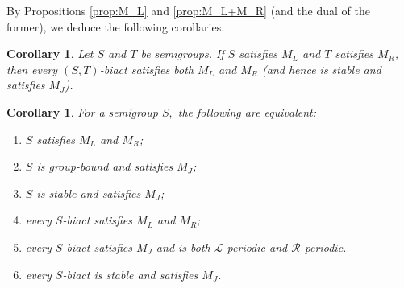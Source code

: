 \documentclass[twoside,a4paper,12pt,reqno]{amsart}
\theoremstyle{plain}
\newtheorem{cor}[thm]{Corollary}
\newtheorem{prop}[thm]{Proposition}
\theoremstyle{definition}
\renewcommand{\l}{\mbox{${\mathcal{L}}$}}
\renewcommand{\r}{\mbox{${\mathcal{R}}$}}
\renewcommand{\j}{\mbox{${\mathcal{J}}$}}
\newcommand{\leql}{\leq_{\mathcal{L}}}
\newcommand{\N}{\mathbb{N}}
\begin{document}
%


By Propositions \ref{prop:M_L} and \ref{prop:M_L+M_R} (and the dual of the former), we deduce the following corollaries.

\begin{cor}
Let $S$ and $T$ be semigroups.  If $S$ satisfies $M_L$ and $T$ satisfies $M_R$, then every $(S,T)$-biact satisfies both $M_L$ and $M_R$ (and hence is stable and satisfies $M_J$).
\end{cor}

\begin{cor}
For a semigroup $S,$ the following are equivalent:
\begin{enumerate}[leftmargin=*]
\item[\emph{(1)}] $S$ satisfies $M_L$ and $M_R$;
\item[\emph{(2)}] $S$ is group-bound and satisfies $M_J$;
\item[\emph{(3)}] $S$ is stable and satisfies $M_J$;
\item[\emph{(4)}] every $S$-biact satisfies $M_L$ and $M_R$;
\item[\emph{(5)}] every $S$-biact satisfies $M_J$ and is both $\l$-periodic and $\r$-periodic.
\item[\emph{(6)}] every $S$-biact is stable and satisfies $M_J$.
\end{enumerate}
\end{cor}
\end{document}
